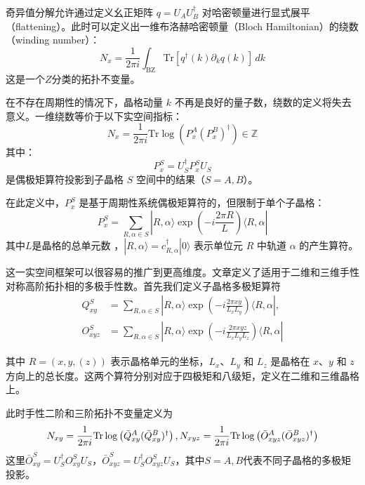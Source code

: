 奇异值分解允许通过定义幺正矩阵 \( q= U_A U_B^\dagger \) 对哈密顿量进行显式展平（flattening）。此时可以定义出一维布洛赫哈密顿量（Bloch Hamiltonian）的绕数（winding number）：
\begin{equation}
N_x = \frac{1}{2\pi i} \int_{\text{BZ}} \mathrm{Tr} \left[ q^\dagger(k) \partial_k q(k) \right] \, dk
\end{equation}
这是一个$Z$分类的拓扑不变量。

在不存在周期性的情况下，晶格动量 \( k \) 不再是良好的量子数，绕数的定义将失去意义。一维绕数等价于以下实空间指标：
\begin{equation}
N_x = \frac{1}{2\pi i} \mathrm{Tr} \log \left( P_x^A (P_x^B)^\dagger \right) \in \mathbb{Z}
\end{equation}
其中：
\begin{equation}
P_x^S = U_S^\dagger P_x^S U_S
\end{equation}
是偶极矩算符投影到子晶格 \( S \) 空间中的结果（\( S = A, B \)）。

在此定义中，\( P_x^S \) 是基于周期性系统偶极矩算符的，但限制于单个子晶格：
\begin{equation}
P_x^S = \sum_{R, \alpha \in S} |R, \alpha \rangle \exp\left( -i \frac{2\pi R}{L} \right) \langle R, \alpha |
\end{equation}
其中\( L \)是晶格的总单元数 ，\( |R, \alpha \rangle = c_{R,\alpha}^\dagger |0\rangle \) 表示单位元 \( R \) 中轨道 \( \alpha \) 的产生算符。

这一实空间框架可以很容易的推广到更高维度。文章定义了适用于二维和三维手性对称高阶拓扑相的多极手性数。首先我们定义子晶格多极矩算符
\begin{equation}
\begin{aligned}
Q_{xy}^S &= \sum_{R, \alpha \in S} |R, \alpha \rangle \exp \left( -i \frac{2\pi xy}{L_x L_y} \right) \langle R, \alpha |, \\
O_{xyz}^S &= \sum_{R, \alpha \in S} |R, \alpha \rangle \exp \left( -i \frac{2\pi xyz}{L_x L_y L_z} \right) \langle R, \alpha |
\end{aligned}
\end{equation}

其中 \( R = (x, y,(z)) \) 表示晶格单元的坐标，\( L_x \)、\( L_y \) 和 \( L_z \) 是晶格在 \( x \)、\( y \) 和 \( z \) 方向上的总长度。这两个算符分别对应于四极矩和八级矩，定义在二维和三维晶格上。

此时手性二阶和三阶拓扑不变量定义为
\begin{equation}
N_{xy} = \frac{1}{2\pi i} \mathrm{Tr} \log \left( \bar{Q}_{xy}^A (\bar{Q}_{xy}^B)^\dagger \right), \\
N_{xyz} = \frac{1}{2\pi i} \mathrm{Tr} \log \left( \bar{O}_{xyz}^A (\bar{O}_{xyz}^B)^\dagger \right)
\end{equation}
这里$\bar{O}_{xy}^S = U_S^\dagger O_{xy}^SU_S$，$\bar{O}_{xyz}^S = U_S^\dagger O_{xyz}^SU_S$，其中$S=A,B$代表不同子晶格的多极矩投影。

